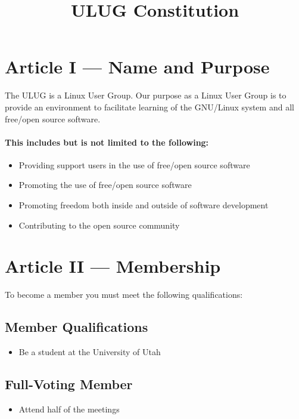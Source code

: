 \documentclass{article}
\begin{document}
\title{ULUG Constitution}

\section{Article I --- Name and Purpose}

The ULUG is a Linux User Group. Our purpose as a Linux User Group is to provide an environment
to facilitate learning of the GNU/Linux system and all free/open source
software.

\paragraph{This includes but is not limited to the following:}

\begin{itemize}
	\item
		Providing support users in the use of free/open source software
	\item
		Promoting the use of free/open source software
	\item
		Promoting freedom both inside and outside of software development
	\item
		Contributing to the open source community
\end{itemize}

\section{Article II --- Membership}

To become a member you must meet the following qualifications:

\subsection{Member Qualifications}

\begin{itemize}
	\item
		Be a student at the University of Utah
\end{itemize}

\subsection{Full-Voting Member}

\begin{itemize}
	\item
		Attend half of the meetings
\end{itemize}
\end{document}
